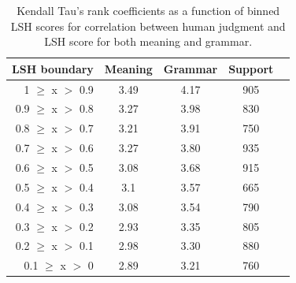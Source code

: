 \documentclass[11pt]{article}
\begin{document}

\begin{table}%
\begin{center}
\begin{tabular}{rcccc}%
\hline \hline
\bf \scriptsize LSH boundary & \bf \scriptsize Meaning & \bf \scriptsize Grammar & \bf \scriptsize Support \\ \hline
{\scriptsize 1 $\geq$ x $>$ 0.9} & {\scriptsize 3.49} & {\scriptsize 4.17} & {\scriptsize 905}  \\
{\scriptsize 0.9 $\geq$ x $>$ 0.8} & {\scriptsize 3.27} & {\scriptsize 3.98} & {\scriptsize 830}  \\
{\scriptsize 0.8 $\geq$ x $>$ 0.7} & {\scriptsize 3.21} & {\scriptsize 3.91} & {\scriptsize 750}  \\
{\scriptsize 0.7 $\geq$ x $>$ 0.6} & {\scriptsize 3.27} & {\scriptsize 3.80} & {\scriptsize 935}  \\
{\scriptsize 0.6 $\geq$ x $>$ 0.5} & {\scriptsize 3.08} & {\scriptsize 3.68} & {\scriptsize 915}  \\
{\scriptsize 0.5 $\geq$ x $>$ 0.4} & {\scriptsize 3.1 } & {\scriptsize 3.57} & {\scriptsize 665}  \\
{\scriptsize 0.4 $\geq$ x $>$ 0.3} & {\scriptsize 3.08} & {\scriptsize 3.54} & {\scriptsize 790}  \\
{\scriptsize 0.3 $\geq$ x $>$ 0.2} & {\scriptsize 2.93} & {\scriptsize 3.35} & {\scriptsize 805}  \\
{\scriptsize 0.2 $\geq$ x $>$ 0.1} & {\scriptsize 2.98} & {\scriptsize 3.30} & {\scriptsize 880}  \\
{\scriptsize 0.1 $\geq$ x $>$ 0} & {\scriptsize 2.89} & {\scriptsize 3.21} & {\scriptsize 760}  \\
\hline
\end{tabular}
\end{center}
\caption{\label{table9} Kendall Tau's rank coefficients as a function of binned LSH scores for correlation between human judgment and LSH score for both meaning and grammar.}
\end{table}


\end{document}
